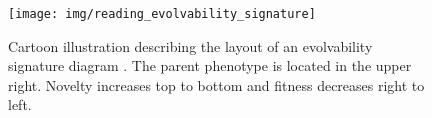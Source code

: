 \begin{figure}
  \texttt{[image: img/reading\_evolvability\_signature]}
  \caption{
    Cartoon illustration describing the layout of an evolvability signature diagram \cite{tarapore2015evolvability}.
    The parent phenotype is located in the upper right.
    Novelty increases top to bottom and fitness decreases right to left.
  }\label{fig:reading_evolvability_signature}
\end{figure}
